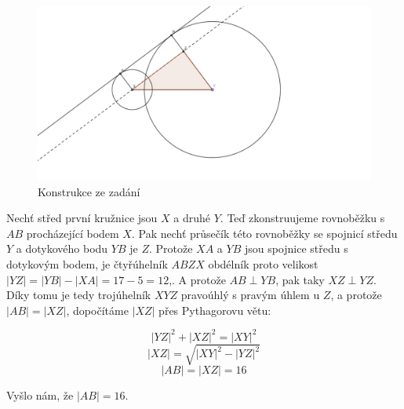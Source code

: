 \documentclass{fkssolpub}
\author{Ondřej Sedláček}
\begin{document}
\begin{figure}[h!]
	\centering
	\includegraphics[width=\textwidth]{1-fig.png}
	\caption{Konstrukce ze zadání}
\end{figure}

Nechť střed první kružnice jsou $X$ a druhé $Y$. Teď zkonstruujeme rovnoběžku
s $AB$ procházející bodem $X$. Pak nechť průsečík této rovnoběžky se spojnicí
středu $Y$ a dotykového bodu $YB$ je $Z$. Protože $XA$ a $YB$ jsou spojnice
středu s dotykovým bodem,
je čtyřúhelník $ABZX$ obdélník proto velikost $|YZ| = |YB| - |XA|
	= 17 - 5 = 12$,. A protože $AB \perp YB$, pak taky $XZ \perp YZ$. Díky
tomu je tedy trojúhelník $XYZ$ pravoúhlý s pravým úhlem u $Z$, a protože
$|AB| = |XZ|$, dopočítáme $|XZ|$ přes Pythagorovu větu:

\[
	|YZ|^2 + |XZ|^2 = |XY|^2
\]
\[
	|XZ| = \sqrt{|XY|^2 - |YZ|^2}
\]
\[
	|AB| = |XZ| = 16
\]

Vyšlo nám, že $|AB| = 16$.
\end{document}
